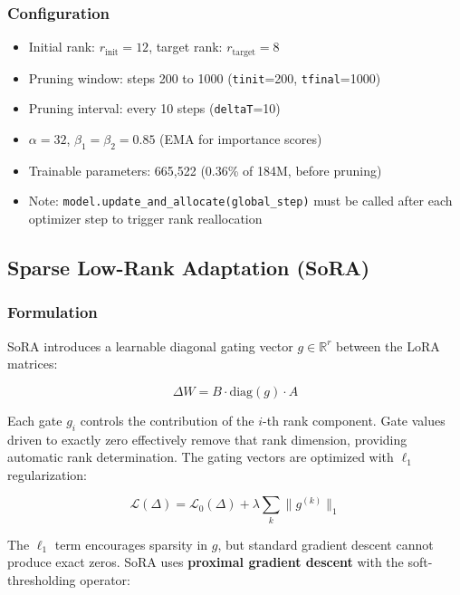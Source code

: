 \documentclass[12pt,a4paper]{article}
\theoremstyle{definition}
\begin{document}
\subsubsection{Configuration}

\begin{itemize}
    \item Initial rank: $r_{\text{init}} = 12$, target rank: $r_{\text{target}} = 8$
    \item Pruning window: steps 200 to 1000 (\texttt{tinit}=200, \texttt{tfinal}=1000)
    \item Pruning interval: every 10 steps (\texttt{deltaT}=10)
    \item $\alpha = 32$, $\beta_1 = \beta_2 = 0.85$ (EMA for importance scores)
    \item Trainable parameters: 665,522 (0.36\% of 184M, before pruning)
    \item Note: \texttt{model.update\_and\_allocate(global\_step)} must be called after each optimizer step to trigger rank reallocation
\end{itemize}

\subsection{Sparse Low-Rank Adaptation (SoRA)}

\subsubsection{Formulation}

SoRA \cite{ding2023sora} introduces a learnable diagonal gating vector $g \in \mathbb{R}^r$ between the LoRA matrices:

\begin{equation}
\Delta W = B \cdot \text{diag}(g) \cdot A
\end{equation}

Each gate $g_i$ controls the contribution of the $i$-th rank component. Gate values driven to exactly zero effectively remove that rank dimension, providing automatic rank determination. The gating vectors are optimized with $\ell_1$ regularization:

\begin{equation}
\mathcal{L}(\Delta) = \mathcal{L}_0(\Delta) + \lambda \sum_k \|g^{(k)}\|_1
\end{equation}

The $\ell_1$ term encourages sparsity in $g$, but standard gradient descent cannot produce exact zeros. SoRA uses \textbf{proximal gradient descent} with the soft-thresholding operator:
\end{document}
